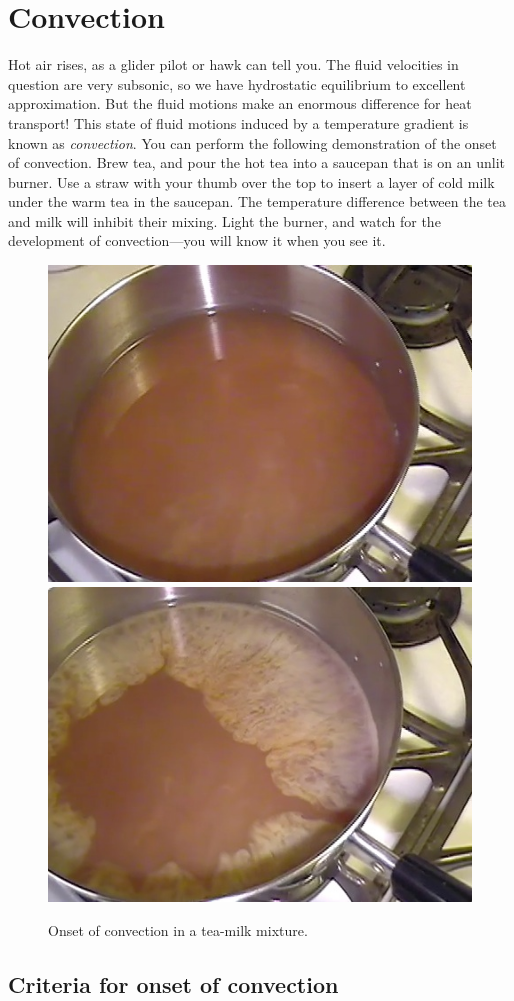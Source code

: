 \chapter{Convection}\label{s.convection}

Hot air rises, as a glider pilot or hawk can tell you. The fluid velocities in question are very subsonic, so we have hydrostatic equilibrium to excellent approximation. But the fluid motions make an enormous difference for heat transport! This state of fluid motions induced by a temperature gradient is known as \emph{convection}. You can perform the following demonstration of the onset of convection.  Brew tea, and pour the hot tea into a saucepan that is on an unlit burner.  Use a straw with your thumb over the top to insert a layer of cold milk under the warm tea in the saucepan.  The temperature difference between the tea and milk will inhibit their mixing. Light the burner, and watch for the development of convection---you will know it when you see it.

\begin{figure}[htbp]
\includegraphics[width=0.5\linewidth]{Figures/convection-1}\includegraphics[width=0.5\linewidth]{Figures/convection-2}
\caption{Onset of convection in a tea-milk mixture.\label{f.tea}}
\end{figure}

\section{Criteria for onset of convection}\label{s.convection-onset}


